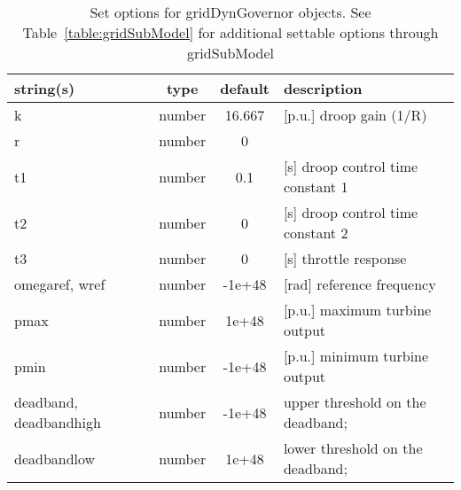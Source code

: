 \begin{table}[ht]
\centering
\begin{tabular}{p{5cm} c c p{7cm}}
\hline
string(s) & type & default & description \\
\hline
k & number & 16.667 & [p.u.] droop gain (1/R)\\
r & number & 0 & \\
t1 & number & 0.1 & [s]   droop control time constant 1\\
t2 & number & 0 & [s]   droop control  time constant 2\\
t3 & number & 0 & [s]  throttle response\\
omegaref, wref & number & -1e+48 & [rad]  reference frequency\\
pmax & number & 1e+48 & [p.u.] maximum turbine output\\
pmin & number & -1e+48 & [p.u.] minimum turbine output\\
deadband, deadbandhigh & number & -1e+48 & upper threshold on the deadband;\\
deadbandlow & number & 1e+48 & lower threshold on the deadband;\\
\hline
\end{tabular}
\caption{Set options for gridDynGovernor objects. See Table~\ref{table:gridSubModel} for additional settable options through gridSubModel}
\label{table:gridDynGovernor}
\end{table}

